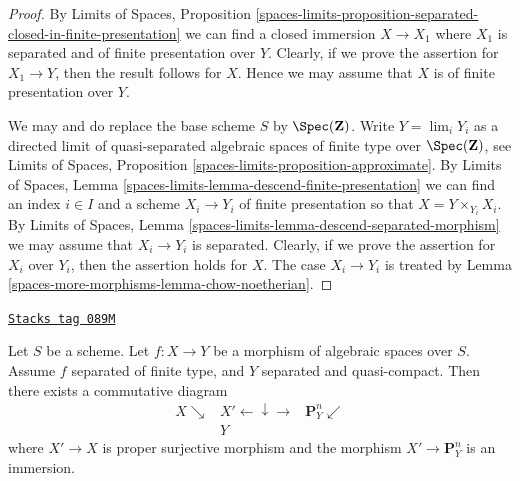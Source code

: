 \begin{proof}
By
Limits of Spaces, Proposition
\ref{spaces-limits-proposition-separated-closed-in-finite-presentation}
we can find a closed immersion $X \to X_1$ where $X_1$ is separated
and of finite presentation over $Y$. Clearly, if we prove the assertion
for $X_1 \to Y$, then the result follows for $X$. Hence we may assume that
$X$ is of finite presentation over $Y$.

\medskip\noindent
We may and do replace the base scheme $S$ by $\Spec(\mathbf{Z})$.
Write $Y = \lim_i Y_i$ as a directed limit of
quasi-separated algebraic spaces of finite type over $\Spec(\mathbf{Z})$, see
Limits of Spaces,
Proposition \ref{spaces-limits-proposition-approximate}.
By
Limits of Spaces,
Lemma \ref{spaces-limits-lemma-descend-finite-presentation}
we can
find an index $i \in I$ and a scheme $X_i \to Y_i$ of finite presentation
so that $X = Y \times_{Y_i} X_i$.
By
Limits of Spaces,
Lemma \ref{spaces-limits-lemma-descend-separated-morphism}
we may assume that $X_i \to Y_i$ is separated.
Clearly, if we prove the assertion for
$X_i$ over $Y_i$, then the assertion holds for $X$. The case
$X_i \to Y_i$ is treated by
Lemma \ref{spaces-more-morphisms-lemma-chow-noetherian}.
\end{proof}

\begin{lemma}
\label{spaces-more-morphisms-lemma-chow-finite-type-separated}
\href{https://stacks.math.columbia.edu/tag/089M}{\texttt{Stacks tag 089M}}

Let $S$ be a scheme. Let $f : X \to Y$ be a morphism of algebraic spaces
over $S$. Assume $f$ separated of finite type, and $Y$ separated and
quasi-compact. Then there exists a commutative diagram
$$
\begin{array}{ccc}X \searrow & X' \longleftarrow\downarrow\longrightarrow & \mathbf{P}^n_Y \swarrow \\  & Y & \end{array}
$$
where $X' \to X$ is proper surjective morphism
and the morphism $X' \to \mathbf{P}^n_Y$ is an immersion.
\end{lemma}

